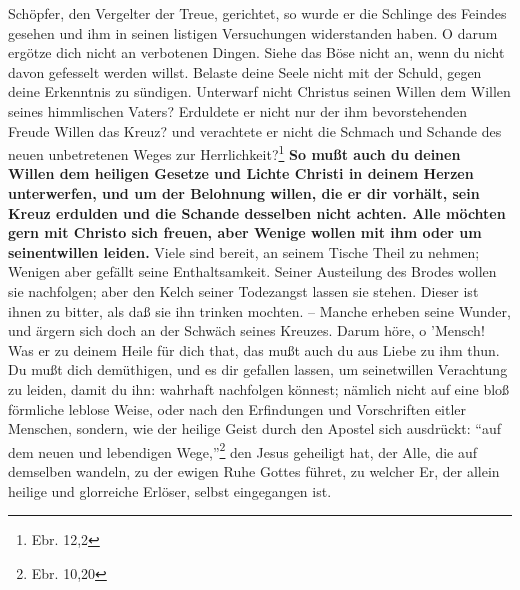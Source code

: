 Schöpfer, den Vergelter der Treue, gerichtet, so wurde er die Schlinge des
Feindes gesehen und ihm in seinen listigen Versuchungen widerstanden haben. O
darum ergötze dich nicht an verbotenen Dingen. Siehe das Böse nicht an, wenn du
nicht davon gefesselt werden willst. Belaste deine Seele nicht mit der Schuld,
gegen deine Erkenntnis zu sündigen. Unterwarf nicht Christus seinen Willen dem
Willen seines himmlischen Vaters? Erduldete er nicht nur der ihm bevorstehenden
Freude Willen das Kreuz? und verachtete er nicht die Schmach und Schande des
neuen unbetretenen Weges zur Herrlichkeit?\footnote{Ebr. 12,2} \textbf{So mußt auch du
deinen Willen dem heiligen Gesetze und Lichte Christi in deinem Herzen
unterwerfen, und um der Belohnung willen, die er dir vorhält, sein Kreuz
erdulden und die Schande desselben nicht achten. Alle möchten gern mit Christo
sich freuen, aber Wenige wollen mit ihm oder um seinentwillen leiden.} Viele sind
bereit, an seinem Tische Theil zu nehmen; Wenigen aber gefällt seine
Enthaltsamkeit. Seiner Austeilung des Brodes wollen sie nachfolgen; aber den
Kelch seiner Todezangst lassen sie stehen. Dieser ist ihnen zu bitter, als daß
sie ihn trinken mochten. -- Manche erheben seine Wunder, und ärgern sich doch an
der Schwäch seines Kreuzes. Darum höre, o ’Mensch! Was er zu deinem Heile für
dich that, das mußt auch du aus Liebe zu ihm thun. Du mußt dich demüthigen, und
es dir gefallen lassen, um seinetwillen Verachtung zu leiden, damit du ihn:
wahrhaft nachfolgen könnest; nämlich nicht auf eine bloß förmliche leblose
Weise, oder nach den Erfindungen und Vorschriften eitler Menschen, sondern, wie
der heilige Geist durch den Apostel sich ausdrückt: "`auf dem neuen und
lebendigen Wege,"'\footnote{Ebr. 10,20} den Jesus geheiligt hat, der Alle, die
auf demselben wandeln, zu der ewigen Ruhe Gottes führet, zu welcher Er, der
allein heilige und glorreiche Erlöser, selbst eingegangen ist.


